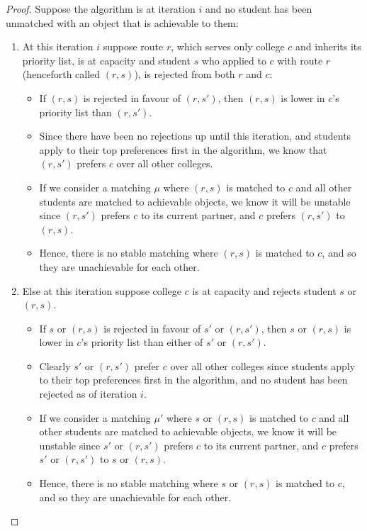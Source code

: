 \documentclass[runningheads]{llncs}
\begin{document}
\begin{proof}
    Suppose the algorithm is at iteration $i$ and no student has been unmatched with an object that is achievable to them:
    \begin{enumerate}
        \item At this iteration $i$ suppose route $r$, which serves only college $c$ and inherits its priority list, is at capacity and student $s$ who applied to $c$ with route $r$ (henceforth called $(r,s)$), is rejected from both $r$ and $c$:
        \begin{itemize}
            \item If $(r,s)$ is rejected in favour of $(r,s')$, then $(r,s)$ is lower in $c$'s priority list than $(r,s')$.
            \item Since there have been no rejections up until this iteration, and students apply to their top preferences first in the algorithm, we know that $(r,s')$ prefers $c$ over all other colleges.
            \item If we consider a matching $\mu$ where $(r,s)$ is matched to $c$ and all other students are matched to achievable objects, we know it will be unstable since $(r,s')$ prefers $c$ to its current partner, and $c$ prefers $(r,s')$ to $(r,s)$.
            \item Hence, there is no stable matching where $(r,s)$ is matched to $c$, and so they are unachievable for each other.
        \end{itemize}
        \item Else at this iteration suppose college $c$ is at capacity and rejects student $s$ or $(r,s)$.
        \begin{itemize}
            \item If $s$ or $(r,s)$ is rejected in favour of $s'$ or $(r,s')$, then $s$ or $(r,s)$ is lower in $c$'s priority list than either of $s'$ or $(r,s')$.
            \item Clearly $s'$ or $(r,s')$ prefer $c$ over all other colleges since students apply to their top preferences first in the algorithm, and no student has been rejected as of iteration $i$.
            \item If we consider a matching $\mu'$ where $s$ or $(r,s)$ is matched to $c$ and all other students are matched to achievable objects, we know it will be unstable since $s'$ or $(r,s')$ prefers $c$ to its current partner, and $c$ prefers $s'$ or $(r,s')$ to $s$ or $(r,s)$.
            \item Hence, there is no stable matching where $s$ or $(r,s)$ is matched to $c$, and so they are unachievable for each other.
        \end{itemize}
    \end{enumerate}
\end{proof}
\end{document}
